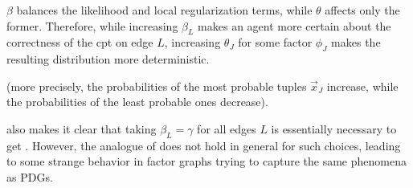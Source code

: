 \documentclass{article}
\theoremstyle{plain}
\theoremstyle{definition}
\theoremstyle{remark}
\numberwithin{equation}{section}
\begin{document}
$\beta$ balances the likelihood and local
regularization terms, while 
$\theta$ affects only the former.
%
Therefore, while
increasing $\beta_L$ makes an agent more certain about the correctness
of the cpt on edge $L$, 
increasing $\theta_J$ for some factor $\phi_J$ makes the
resulting distribution more deterministic. 
\begin{vfull}
(more precisely, the probabilities of the most probable tuples $\vec{x}_J$ 
increase, while the probabilities of the least probable ones decrease). 
\end{vfull}

 also makes it clear that 
taking $\beta_L = \gamma$ for all edges $L$ is
essentially necessary to get .
However, the analogue of  does not hold
in general for
such choices,
leading to some
strange
behavior in factor graphs trying to capture the same phenomena as PDGs.
\end{document}
